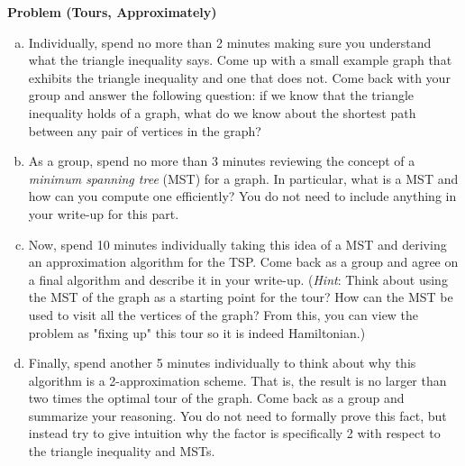 \documentclass[12pt]{article}
\newcommand{\hint}[1]{(\emph{Hint}: #1)}
\newcounter{ProblemCounter}
\newenvironment{problem}[1][]
  {\refstepcounter{ProblemCounter}\noindent\textbf{Problem \theProblemCounter{} (#1)}\quad}
  {\newpage}
\newcommand{\answerbelow}{\noindent\makebox[\linewidth]{\rule{\textwidth}{0.4pt}}}
\begin{document}
\begin{problem}[Tours, Approximately]
\begin{enumerate}[(a)]
  \item Individually, spend no more than 2 minutes making sure you understand
    what the triangle inequality says.  Come up with a small example graph that
    exhibits the triangle inequality and one that does not.  Come back with
    your group and answer the following question: if we know that the triangle
    inequality holds of a graph, what do we know about the shortest path
    between any pair of vertices in the graph?
  \item As a group, spend no more than 3 minutes reviewing the concept of a
    \emph{minimum spanning tree} (MST) for a graph.  In particular, what is a MST
    and how can you compute one efficiently?  You do not need to include anything in
    your write-up for this part.
  \item Now, spend 10 minutes individually taking this idea of a MST and
    deriving an approximation algorithm for the TSP.  Come back as a group and agree
    on a final algorithm and describe it in your write-up.  \hint{Think about
    using the MST of the graph as a starting point for the tour?  How can the
    MST be used to visit all the vertices of the graph?  From this, you can view the
    problem as "fixing up" this tour so it is indeed Hamiltonian.}
  \item Finally, spend another 5 minutes individually to think about why this algorithm
    is a 2-approximation scheme.  That is, the result is no larger than two times the
    optimal tour of the graph.  Come back as a group and summarize your reasoning.
    You do not need to formally prove this fact, but instead try to give intuition why
    the factor is specifically 2 with respect to the triangle inequality and MSTs.
\end{enumerate}

\answerbelow

\end{problem}

\end{document}
